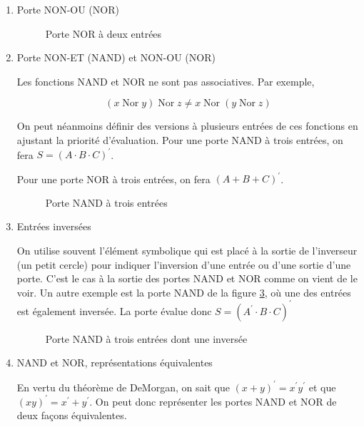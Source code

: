 \documentclass[letter, oneside]{book}
\begin{document}
\begin{enumerate}
\item Porte NON-OU (NOR)
\label{sec:org7e5a91f}

\begin{figure}[htbp]
\centering

\caption{\label{fig:org3d04671}Porte NOR à deux entrées}
\end{figure}

\item Porte NON-ET (NAND) et NON-OU (NOR)
\label{sec:org585fcdb}

Les fonctions NAND et NOR ne sont pas associatives. Par exemple,

$$
(x \operatorname{Nor} y) \operatorname{Nor} z \neq x \operatorname{Nor} (y \operatorname{Nor} z) 
$$

On peut néanmoins définir des versions à plusieurs entrées de ces
fonctions en ajustant la priorité d'évaluation. Pour une porte NAND à
trois entrées, on fera \(S = (A \cdot B \cdot C)^\prime\).

Pour une porte NOR à trois entrées, on fera \((A + B + C)^\prime\).

\begin{figure}[htbp]
\centering

\caption{\label{fig:orgc0bfd10}Porte NAND à trois entrées}
\end{figure}

\item Entrées inversées
\label{sec:orga6dc863}

On utilise souvent l'élément symbolique qui est placé à la sortie de
l'inverseur (un petit cercle) pour indiquer l'inversion d'une entrée
ou d'une sortie d'une porte. C'est le cas à la sortie des portes NAND
et NOR comme on vient de le voir. Un autre exemple est la porte NAND
de la figure \ref{fig:org37cb83a}, où une des entrées est également
inversée. La porte évalue donc \(S =  (A^\prime \cdot B  \cdot C)^\prime\)

\begin{figure}[htbp]
\centering

\caption{\label{fig:org37cb83a}Porte NAND à trois entrées dont une inversée}
\end{figure} 

\item NAND et NOR, représentations équivalentes
\label{sec:org1c61ccc}

En vertu du théorème de DeMorgan, on sait que \((x + y)^{\prime} =
x^{\prime} y^{\prime}\) et que \((xy)^{\prime} = x^{\prime} +
y^{\prime}\). On peut donc représenter les portes NAND et NOR de deux
façons équivalentes.


\end{enumerate}
\end{document}
